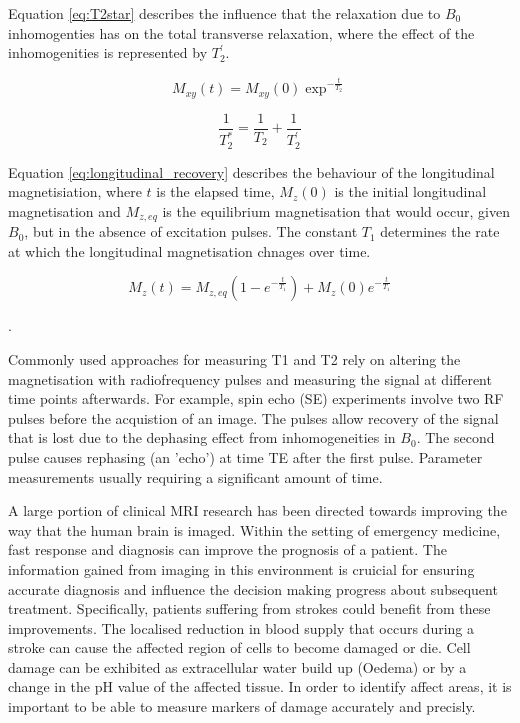 \documentclass[3p, twocolumn]{elsarticle}
\begin{document}
Equation \eqref{eq:T2star} describes the influence that the relaxation due to $B_0$ inhomogenties has on the total transverse relaxation, where the effect of the inhomogenities is represented by $T^{'}_{2}$.

\begin{equation} \label{eq:transverse_decay}
M_{xy} (t) = M_{xy}(0)\exp^{-\frac{t}{T_{2}}}
\end{equation}


\begin{equation} \label{eq:T2star}
 \frac{1}{T^{*}_{2}} = \frac{1}{T_{2}} + \frac{1}{T^{'}_2}
\end{equation}

Equation \eqref{eq:longitudinal_recovery} describes the behaviour of the longitudinal magnetisiation, where $ t $ is the elapsed time, $M_{z}(0)$ is the initial longitudinal magnetisation and $M_{z,eq}$ is the equilibrium magnetisation that would occur, given $B_0$, but in the absence of excitation pulses. The constant $T_1$ determines the rate at which the longitudinal magnetisation chnages over time.

\begin{equation} \label{eq:longitudinal_recovery}
M_{z} (t) = M_{z,eq}(1 - e^{-\frac{t}{T_1}} ) + M_{z}(0)e^{-\frac{t}{T_1} } 
\end{equation}

 \cite{haackemagnetic}.


Commonly used approaches for measuring T1 and T2 rely on altering the magnetisation with radiofrequency pulses and measuring the signal at different time points afterwards. For example, spin echo (SE) experiments involve two RF pulses before the acquistion of an image. The pulses allow recovery of the signal that is lost due to the dephasing effect from inhomogeneities in $B_0$. The second pulse causes rephasing (an 'echo') at time TE after the first pulse. Parameter measurements usually requiring a significant amount of time.   %

A large portion of clinical MRI research has been directed towards improving the way that the human brain is imaged.
Within the setting of emergency medicine, fast response and diagnosis can improve the prognosis of a patient. The information gained from imaging in this environment is cruicial for ensuring accurate diagnosis and influence the decision making progress about subsequent treatment. Specifically, patients suffering from strokes could benefit from these improvements. The localised reduction in blood supply that occurs during a stroke can cause the affected region of cells to become damaged or die. Cell damage can be exhibited as extracellular water build up (Oedema) or by a change in the pH value of the affected tissue. In order to identify affect areas, it is important to be able to measure markers of damage accurately and precisly.
\end{document}

